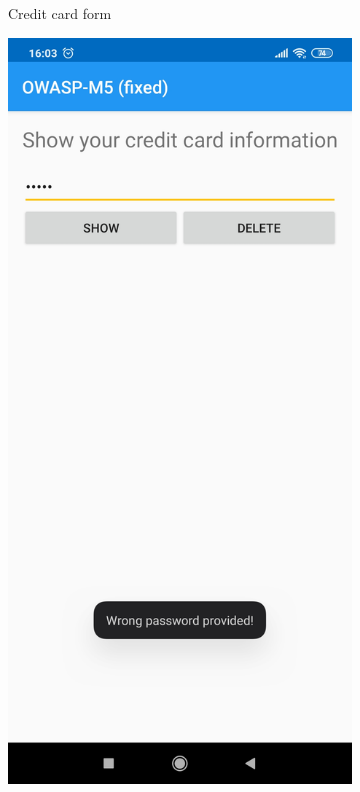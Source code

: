 \begin{figure}[htb!]
\begin{subfigure}{.3\textwidth}
  		\caption{Credit card form}
	\end{subfigure}
	\begin{subfigure}{.3\textwidth}
  		\centering
  		\includegraphics[width=\linewidth]{imgs/secure_mobile_programming/app1_credit_card_info_wrong_password.jpg}

\end{subfigure}
\end{figure}
